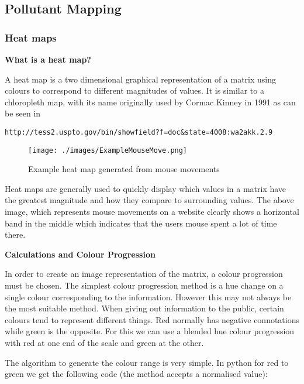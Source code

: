 \subsection{Pollutant Mapping}\label{pollutantmapping}

\subsubsection{Heat maps}\label{heatmaps}

\textbf{What is a heat map?}

A heat map is a two dimensional graphical representation of a matrix using colours to correspond to different magnitudes of values. It is similar to a chloropleth map, with its name originally used by Cormac Kinney in 1991 as can be seen in \begin{verbatim}http://tess2.uspto.gov/bin/showfield?f=doc&state=4008:wa2akk.2.9\end{verbatim}

\begin{figure}[H]
        \begin{center}
                \texttt{[image: ./images/ExampleMouseMove.png]}
                \caption{Example heat map generated from mouse movements}
        \end{center}
\end{figure}

Heat maps are generally used to quickly display which values in a matrix have the greatest magnitude and how they compare to surrounding values. The above image, which represents mouse movements on a website clearly shows a horizontal band in the middle which indicates that the users mouse spent a lot of time there. 

\textbf{Calculations and Colour Progression}

In order to create an image representation of the matrix, a colour progression must be chosen. The simplest colour progression method is a hue change on a single colour corresponding to the information. However this may not always be the most suitable method. When giving out information to the public, certain colours tend to represent different things. Red normally has negative connotations while green is the opposite. For this we can use a blended hue colour progression with red at one end of the scale and green at the other.

The algorithm to generate the colour range is very simple. In python for red to green we get the following code (the method accepts a normalised value):

